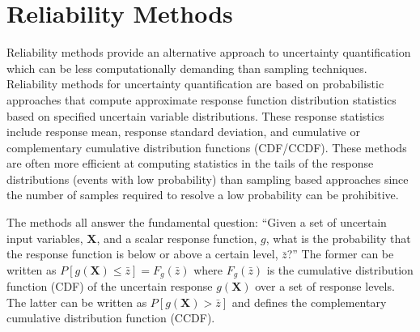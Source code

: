 \section{Reliability Methods}\label{uq:reliability}

Reliability methods provide an alternative approach to uncertainty
quantification which can be less computationally demanding than
sampling techniques. Reliability methods for uncertainty
quantification are based on probabilistic approaches that compute
approximate response function distribution statistics based on
specified uncertain variable distributions. These response statistics
include response mean, response standard deviation, and cumulative or
complementary cumulative distribution functions (CDF/CCDF). These
methods are often more efficient at computing statistics in the tails
of the response distributions (events with low probability) than
sampling based approaches since the number of samples required to
resolve a low probability can be prohibitive.

The methods all answer the fundamental question: ``Given a set of
uncertain input variables, $\mathbf{X}$, and a scalar response
function, $g$, what is the probability that the response function is
below or above a certain level, $\bar{z}$?'' The former can be written
as $P[g(\mathbf{X}) \le \bar{z}] = \mathit{F}_{g}(\bar{z})$ where
$\mathit{F}_{g}(\bar{z})$ is the cumulative distribution function
(CDF) of the uncertain response $g(\mathbf{X})$ over a set of response
levels. The latter can be written as $P[g(\mathbf{X}) > \bar{z}]$ and
defines the complementary cumulative distribution function (CCDF).

